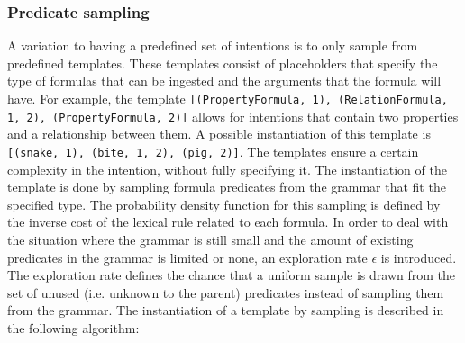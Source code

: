 \documentclass[a4paper]{article}
\begin{document}
\subsubsection{Predicate sampling}
\label{sec:predicate_sampling}
A variation to having a predefined set of intentions is to only sample from predefined templates. These templates consist of placeholders that specify the type of formulas that can be ingested and the arguments that the formula will have. For example, the template \verb|[(PropertyFormula, 1), (RelationFormula, 1, 2), (PropertyFormula, 2)]| allows for intentions that contain two properties and a relationship between them. A possible instantiation of this template is \verb|[(snake, 1), (bite, 1, 2), (pig, 2)]|. The templates ensure a certain complexity in the intention, without fully specifying it. The instantiation of the template is done by sampling formula predicates from the grammar that fit the specified type. The probability density function for this sampling is defined by the inverse cost of the lexical rule related to each formula. In order to deal with the situation where the grammar is still small and the amount of existing predicates in the grammar is limited or none, an exploration rate $\epsilon$ is introduced. The exploration rate defines the chance that a uniform sample is drawn from the set of unused (i.e. unknown to the parent) predicates instead of sampling them from the grammar. The instantiation of a template by sampling is described in the following algorithm:
\end{document}
